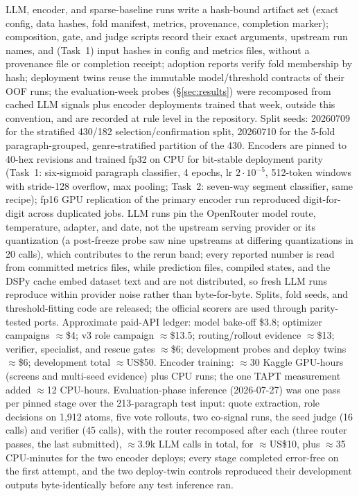 \documentclass[11pt]{article}
\begin{document}
LLM, encoder, and sparse-baseline runs write a hash-bound artifact set
(exact config, data hashes, fold manifest, metrics, provenance,
completion marker); composition, gate, and judge scripts record their
exact arguments, upstream run names, and (Task~1) input hashes in
config and metrics files, without a provenance file or completion
receipt; adoption reports verify fold membership by hash; deployment
twins reuse the immutable model/threshold contracts of their OOF runs;
the evaluation-week probes (\S\ref{sec:results}) were recomposed from
cached LLM signals plus encoder deployments trained that week, outside
this convention, and are recorded at rule level in the repository. Split seeds: 20260709 for
the stratified 430/182 selection/confirmation split, 20260710 for the
5-fold paragraph-grouped, genre-stratified partition of the 430. Encoders are pinned to
40-hex revisions and trained fp32 on CPU for bit-stable deployment
parity (Task~1: six-sigmoid paragraph classifier, 4 epochs, lr
$2{\cdot}10^{-5}$, 512-token windows with stride-128 overflow, max
pooling; Task~2: seven-way segment classifier, same recipe); fp16 GPU
replication of the primary encoder run reproduced digit-for-digit across
duplicated jobs. LLM runs pin the OpenRouter model
route, temperature, adapter, and date, not the upstream serving provider
or its quantization (a post-freeze probe saw nine upstreams at differing
quantizations in 20 calls), which contributes to the rerun band; every reported number is read from
committed metrics files, while prediction files, compiled states, and the
DSPy cache embed dataset text and are not distributed, so fresh LLM runs
reproduce within provider noise rather than byte-for-byte. Splits, fold seeds,
and threshold-fitting code are released; the official scorers are used
through parity-tested ports. Approximate paid-API ledger: model bake-off
\$3.8; optimizer campaigns ${\approx}$\$4; v3 role campaign
${\approx}$\$13.5; routing/rollout evidence ${\approx}$\$13; verifier,
specialist, and rescue gates ${\approx}$\$6; development probes and
deploy twins ${\approx}$\$6; development total ${\approx}$US\$50. Encoder training:
${\approx}$30 Kaggle GPU-hours (screens and multi-seed evidence) plus
CPU runs; the one TAPT measurement added ${\approx}$12 CPU-hours.
Evaluation-phase inference (2026-07-27) was one pass per pinned stage
over the 213-paragraph test input: quote extraction, role decisions on
1{,}912 atoms, five vote rollouts, two co-signal runs, the seed judge
(16 calls) and verifier (45 calls), with the router recomposed after
each (three router passes, the last submitted), ${\approx}$3.9k LLM
calls in total, for ${\approx}$US\$10, plus ${\approx}$35 CPU-minutes for the
two encoder deploys; every stage completed error-free on the first
attempt, and the two deploy-twin controls reproduced their development
outputs byte-identically before any test inference ran.
\end{document}
